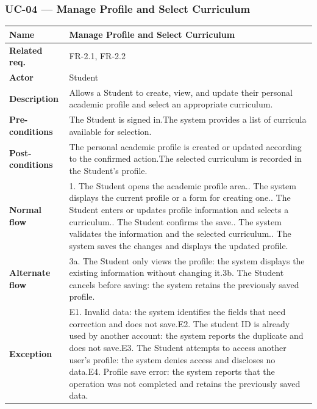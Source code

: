 \subsubsection{UC-04 --- Manage Profile and Select Curriculum}
\begin{longtable}{|p{}|p{}|}
\hline
\textbf{Name} & Manage Profile and Select Curriculum \\
\hline
\textbf{Related req.} & FR-2.1, FR-2.2 \\
\hline
\textbf{Actor} & Student \\
\hline
\textbf{Description} & Allows a Student to create, view, and update their personal academic profile and select an appropriate curriculum. \\
\hline
\textbf{Pre-conditions} & The Student is signed in.\newline The system provides a list of curricula available for selection. \\
\hline
\textbf{Post-conditions} & The personal academic profile is created or updated according to the confirmed action.\newline The selected curriculum is recorded in the Student's profile. \\
\hline
\textbf{Normal flow} & 1. The Student opens the academic profile area.\newline 2. The system displays the current profile or a form for creating one.\newline 3. The Student enters or updates profile information and selects a curriculum.\newline 4. The Student confirms the save.\newline 5. The system validates the information and the selected curriculum.\newline 6. The system saves the changes and displays the updated profile. \\
\hline
\textbf{Alternate flow} & 3a. The Student only views the profile: the system displays the existing information without changing it.\newline 3b. The Student cancels before saving: the system retains the previously saved profile. \\
\hline
\textbf{Exception} & E1. Invalid data: the system identifies the fields that need correction and does not save.\newline E2. The student ID is already used by another account: the system reports the duplicate and does not save.\newline E3. The Student attempts to access another user's profile: the system denies access and discloses no data.\newline E4. Profile save error: the system reports that the operation was not completed and retains the previously saved data. \\
\hline
\end{longtable}

